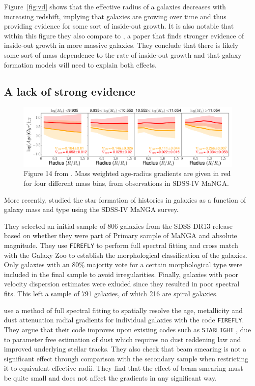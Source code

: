 \documentclass[preprint2]{aastex631}
\begin{document}
Figure~\ref{fig:vd} shows that the effective radius of a galaxies decreases with increasing redshift, implying that galaxies are growing over time and thus providing evidence for some sort of inside-out growth. It is also notable that within this figure they also compare to \citet{Patel+2013}, a paper that finds stronger evidence of inside-out growth in more massive galaxies. They conclude that there is likely some sort of mass dependence to the rate of inside-out growth and that galaxy formation models will need to explain both effects.

\subsection{A lack of strong evidence}

\begin{figure}[t]
    \centering
    \includegraphics[width=\textwidth]{goddard2017_fig14.png}
    \caption{Figure 14 from \citet{Goddard+2017}. Mass weighted age-radius gradients are given in red for four different mass bins, from observations in SDSS-IV MaNGA.}
    \label{fig:goddard}
\end{figure}

More recently, \citet{Goddard+2017} studied the star formation of histories in galaxies as a function of galaxy mass and type using the SDSS-IV MaNGA survey.

They selected an initial sample of 806 galaxies from the SDSS DR13 release based on whether they were part of Primary sample of MaNGA and absolute magnitude. They use \texttt{FIREFLY} to perform full spectral fitting and cross match with the Galaxy Zoo to establish the morphological classification of the galaxies. Only galaxies with an 80\% majority vote for a certain morphological type were included in the final sample to avoid irregularities. Finally, galaxies with poor velocity dispersion estimates were exluded since they resulted in poor spectral fits. This left a sample of 791 galaxies, of which 216 are spiral galaxies.

\citet{Goddard+2017} use a method of full spectral fitting to spatially resolve the age, metallicity and dust attenuation radial gradients for individual galaxies with the code \texttt{FIREFLY}. They argue that their code improves upon existing codes such as \texttt{STARLIGHT} \citep{CidFernandes+2005}, due to parameter free estimation of dust which requires no dust reddening law and improved underlying stellar tracks. They also check that beam smearing is not a significant effect through comparison with the secondary sample when restricting it to equivalent effective radii. They find that the effect of beam smearing must be quite small and does not affect the gradients in any significant way.
\end{document}
